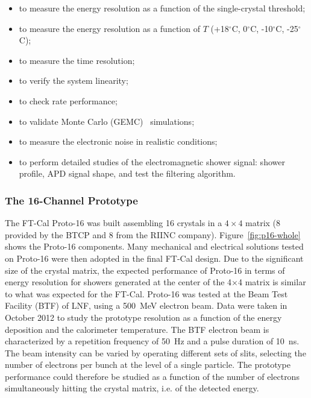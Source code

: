 \begin{itemize}
\item to measure the energy resolution as a function of the single-crystal threshold;
\item to measure the energy resolution as a function of $T$ (+18$^\circ$C, 0$^\circ$C, -10$^\circ$C, -25$^\circ$C);
\item to measure the time resolution;
\item to verify the system linearity;
\item to check rate performance;
\item to validate Monte Carlo (GEMC)~\cite{gemc} simulations;
\item to measure the electronic noise in realistic conditions;
\item to perform detailed studies of the electromagnetic shower signal: shower profile, APD signal shape, and test
  the filtering algorithm.
\end{itemize}

\subsubsection{The 16-Channel Prototype}
\label{par:proto-16}

The FT-Cal Proto-16 was built assembling 16 crystals in a $4\times4$ matrix (8 provided by the BTCP and 8 from
the RIINC company). Figure~\ref{fig:p16-whole} shows the Proto-16 components. Many mechanical and electrical
solutions tested on Proto-16 were then adopted in the final FT-Cal design. Due to the significant size of the crystal
matrix, the expected performance of Proto-16 in terms of energy resolution for showers generated at the center
of the 4$\times$4 matrix is similar to what was expected for the FT-Cal. Proto-16 was tested at the Beam
Test Facility (BTF) \cite{btf} of LNF, using a 500~MeV electron beam. Data were taken in October 2012 to study
the prototype resolution as a function of the energy deposition and the calorimeter temperature. The BTF electron
beam is characterized by a repetition frequency of 50~Hz and a pulse duration of 10~ns. The beam intensity can be
varied by operating different sets of slits, selecting the number of electrons per bunch at the level of a single
particle. The prototype performance could therefore be studied as a function of the number of electrons 
simultaneously hitting the crystal matrix, i.e. of the detected energy.

